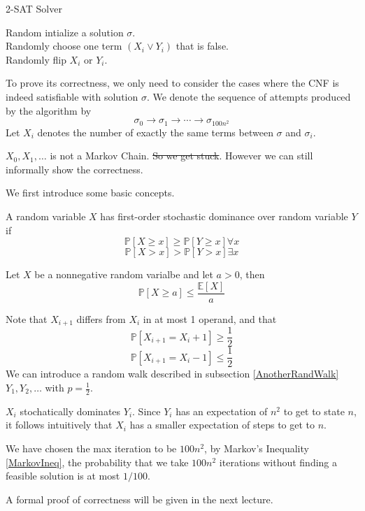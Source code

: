 \begin{algorithm}
    \caption{2-SAT Solver}
    Random intialize a solution $\sigma$.\\
    {
        {
            \KwRet{$\sigma$}
        }
        \Else
        {
            Randomly choose one term $(X_i \vee Y_i)$ that is false.\\
            Randomly flip $X_i$ or $Y_i$.
        }
    }
\end{algorithm}

To prove its correctness, we only need to consider the cases where the CNF is indeed satisfiable with solution $\sigma$. We denote the sequence of attempts produced by the algorithm by
\[ \sigma_0 \to \sigma_1 \to \cdots \to \sigma_{100n^2} \]
Let $X_i$ denotes the number of exactly the same terms between $\sigma$ and $\sigma_i$.

$X_0, X_1, \dots$ is not a Markov Chain. \sout{So we get stuck}. However we can still informally show the correctness.

We first introduce some basic concepts.
\begin{definition}
    A random variable $X$ has first-order stochastic dominance over random variable $Y$ if
    \[ \mathbb{P}[X \ge x] \ge \mathbb{P}[Y \ge x] \forall x \]
    \[ \mathbb{P}[X > x] > \mathbb{P}[Y > x] \exists x \]
\end{definition}
\begin{theorem}\label{MarkovIneq}
    Let $X$ be a nonnegative random varialbe and let $a > 0$, then
    \[ \mathbb{P}[X \ge a] \le \frac{\mathbb{E}[X]}{a} \]
\end{theorem}
\begin{sketchproof}
    Note that $X_{i+1}$ differs from $X_i$ in at most 1 operand, and that
    \[ \mathbb{P}[X_{i+1} = X_i + 1] \ge \frac{1}{2} \]
    \[ \mathbb{P}[X_{i+1} = X_i - 1] \le \frac{1}{2} \]
    We can introduce a random walk described in subsection \ref{AnotherRandWalk} $Y_1, Y_2, \dots$ with $p = \frac{1}{2}$.

    $X_i$ stochatically dominates $Y_i$. Since $Y_i$ has an expectation of $n^2$ to get to state $n$, it follows intuitively that $X_i$ has a smaller expectation of steps to get to $n$.

    We have chosen the max iteration to be $100n^2$, by Markov's Inequality \ref{MarkovIneq}, the probability that we take $100n^2$ iterations without finding a feasible solution is at most $1/100$.
\end{sketchproof}
\begin{remark}
    A formal proof of correctness will be given in the next lecture.
\end{remark}